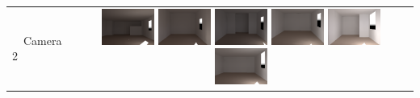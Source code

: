 \documentclass[landscape,20pt]{sciposter}
\begin{document}
\begin{minipage}[t]{17in}
\begin{tabular}{lc}
\\
\begin{sideways}~~Camera 2\end{sideways}&
  \includegraphics[width=0.158\textwidth]{../gi2012_userstudy/images/renderings/ground_truth/mrc331_camera_dark_march_crop.png}
  \includegraphics[width=0.158\textwidth]{../gi2012_userstudy/images/renderings/renovations/065_camera_dark_march_crop.png}
  \includegraphics[width=0.158\textwidth]{../gi2012_userstudy/images/renderings/renovations/038_camera_dark_march_crop.png}
  \includegraphics[width=0.158\textwidth]{../gi2012_userstudy/images/renderings/renovations/042_camera_dark_march_crop.png}
  \includegraphics[width=0.158\textwidth]{../gi2012_userstudy/images/renderings/renovations/031_camera_dark_march_crop.png}
  \includegraphics[width=0.158\textwidth]{../gi2012_userstudy/images/renderings/renovations/014_camera_dark_march_crop.png}\\
  \end{tabular}
  

\end{minipage}
\end{document}
